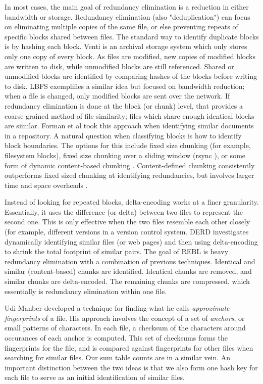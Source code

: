 \documentclass[10pt, twocolumn]{article}
\begin{document}
In most cases, the main goal of redundancy elimination is a reduction in either bandwidth or storage. Redundancy elimination (also "deduplication") can focus on eliminating multiple copies of the same file, or else preventing repeats of specific blocks shared between files. The standard way to identify duplicate blocks is by hashing each block. Venti \cite{venti} is an archival storage system which only stores only one copy of every block. As files are modified, new copies of modified blocks are written to disk, while unmodified blocks are still referenced. Shared or unmodified blocks are identified by comparing hashes of the blocks before writing to disk. LBFS \cite{lbfs} exemplifies a similar idea but focused on bandwidth reduction; when a file is changed, only modified blocks are sent over the network. If redundancy elimination is done at the block (or chunk) level, that provides a coarse-grained method of file similarity; files which share enough identical blocks are similar. Forman et al\cite{hpDocRepositories} took this approach when identifying similar documents in a repository. A natural question when classifying blocks is how to identify block boundaries. The options for this include fixed size chunking (for example, filesystem blocks), fixed size chunking over a sliding window (rsync \cite{rsync}), or some form of dynamic content-based chunking \cite{lbfs}. Content-defined chunking consistently outperforms fixed sized chunking at identifying redundancies, but involves larger time and space overheads  \cite{policroniades2004adr}.

Instead of looking for repeated blocks, delta-encoding works at a finer granularity. Essentially, it uses the difference (or delta) between two files to represent the second one. This is only effective when the two files resemble each other closely (for example, different versions in a version control system. DERD \cite{derd} investigates dynamically identifying similar files (or web pages) and then using delta-encoding to shrink the total footprint of similar pairs. The goal of REBL \cite{rebl} is heavy redundancy elimination with a combination of previous techniques. Identical and similar (content-based) chunks are identified. Identical chunks are removed, and similar chunks are delta-encoded. The remaining chunks are compressed, which essentially is redundancy elimination within one file.

Udi Manber \cite{manber} developed a technique for finding what he calls \emph{approximate fingerprints} of a file. His approach involves the concept of a set of \emph{anchors}, or small patterns of characters. In each file, a checksum of the characters around occurances of each anchor is computed. This set of checksums forms the fingerprints for the file, and is compared against fingerprints for other files when searching for similar files. Our sum table counts are in a similar vein. An important distinction between the two ideas is that we also form one hash key for each file to serve as an initial identification of similar files. 
\end{document}
